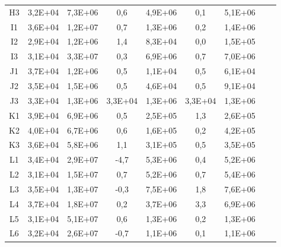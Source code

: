\begin{center}
\begin{longtable}{ccccccccc}
H3    & 3,2E+04 & 7,3E+06 & 0,6   & 4,9E+06 & 0,1   & 5,1E+06 \\
I1    & 3,6E+04 & 1,2E+07 & 0,7   & 1,3E+06 & 0,2   & 1,4E+06 \\
I2    & 2,9E+04 & 1,2E+06 & 1,4   & 8,3E+04 & 0,0   & 1,5E+05 \\
I3    & 3,1E+04 & 3,3E+07 & 0,3   & 6,9E+06 & 0,7   & 7,0E+06 \\
J1    & 3,7E+04 & 1,2E+06 & 0,5   & 1,1E+04 & 0,5   & 6,1E+04 \\
J2    & 3,5E+04 & 1,5E+06 & 0,5   & 4,6E+04 & 0,5   & 9,1E+04 \\
J3    & 3,3E+04 & 1,3E+06 & 3,3E+04 & 1,3E+06 & 3,3E+04 & 1,3E+06 \\
K1    & 3,9E+04 & 6,9E+06 & 0,5   & 2,5E+05 & 1,3   & 2,6E+05 \\
K2    & 4,0E+04 & 6,7E+06 & 0,6   & 1,6E+05 & 0,2   & 4,2E+05 \\
K3    & 3,6E+04 & 5,8E+06 & 1,1   & 3,1E+05 & 0,5   & 3,5E+05 \\
L1    & 3,4E+04 & 2,9E+07 & -4,7  & 5,3E+06 & 0,4   & 5,2E+06 \\
L2    & 3,1E+04 & 1,5E+07 & 0,7   & 5,2E+06 & 0,7   & 5,4E+06 \\
L3    & 3,5E+04 & 1,3E+07 & -0,3  & 7,5E+06 & 1,8   & 7,6E+06 \\
L4    & 3,7E+04 & 1,8E+07 & 0,2   & 3,7E+06 & 3,3   & 6,9E+06 \\
L5    & 3,1E+04 & 5,1E+07 & 0,6   & 1,3E+06 & 0,2   & 1,3E+06 \\
L6    & 3,2E+04 & 2,6E+07 & -0,7  & 1,1E+06 & 0,1   & 1,1E+06 \\
\end{longtable}
\end{center}

